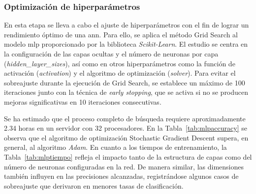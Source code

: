 \subsubsection{Optimización de hiperparámetros}

En esta etapa se lleva a cabo el ajuste de hiperparámetros con el fin de lograr un rendimiento óptimo de una \gls{ann}. Para ello, se aplica el método Grid Search al modelo \gls{mlp} proporcionado por la biblioteca \textit{Scikit-Learn}. El estudio se centra en la configuración de las capas ocultas y el número de neuronas por capa (\textit{hidden\_layer\_sizes}), así como en otros hiperparámetros como la función de activación (\textit{activation}) y el algoritmo de optimización (\textit{solver}). Para evitar el sobreajuste durante la ejecución de Grid Search, se establece un máximo de 100 iteraciones junto con la técnica de \textit{early stopping}, que se activa si no se producen mejoras significativas en 10 iteraciones consecutivas. 

Se ha estimado que el proceso completo de búsqueda requiere aproximadamente 2.34 horas en un servidor con 32 procesadores. En la Tabla~\ref{tab:mlpaccuracy} se observa que el algoritmo de optimización Stochastic Gradient Descent supera, en general, al algoritmo \textit{Adam}. En cuanto a los tiempos de entrenamiento, la Tabla~\ref{tab:mlptiempo} refleja el impacto tanto de la estructura de capas como del número de neuronas configuradas en la red. De manera similar, las dimensiones también influyen en las precisiones alcanzadas, registrándose algunos casos de sobreajuste que derivaron en menores tasas de clasificación.  


